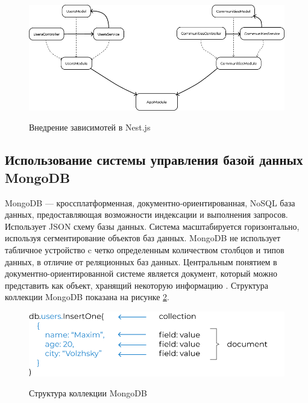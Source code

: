 \begin{figure}[H]
\begin{center}
\includegraphics[width=1.0\hsize]{fig/nestjs-ioc.png}\\[2mm]
\caption{Внедрение зависимотей в Nest.js}\label{fig:nestjs-ioc}
\end{center}
\end{figure}

\subsection{Использование системы управления базой данных MongoDB}

MongoDB — кроссплатформенная, документно-ориентированная, NoSQL база данных, предоставляющая возможности индексации и выполнения запросов. Использует JSON схему базы данных. Система масштабируется горизонтально, используя сегментирование объектов баз данных. MongoDB не использует табличное устройство c четко определенным количеством столбцов и типов данных, в отличие от реляционных баз данных. Центральным понятием в документно-ориентированной системе является документ, который можно представить как объект, хранящий некоторую информацию \cite{Mongo}. Структура коллекции MongoDB показана на рисунке \ref{fig:mongodb}.

\begin{figure}[H]
\begin{center}
\includegraphics[width=1.0\hsize]{fig/mongodb.png}\\[2mm]
\caption{Структура коллекции MongoDB}\label{fig:mongodb}
\end{center}
\end{figure}


